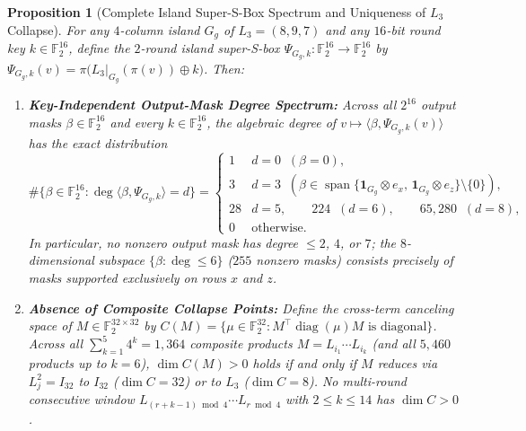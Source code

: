 \documentclass[11pt,a4paper]{article}
\newtheorem{proposition}{Proposition}
\theoremstyle{definition}
\theoremstyle{remark}
\newcommand{\Ftwo}{\mathbb{F}_2}
\newcommand{\spanF}{\operatorname{span}}
\begin{document}
\begin{proposition}[Complete Island Super-S-Box Spectrum and Uniqueness of $L_3$ Collapse]
\label{prop:supersbox-spectrum}
For any $4$-column island $G_g$ of $L_3 = (8,9,7)$ and any $16$-bit round key $k \in \Ftwo^{16}$, define the $2$-round island super-S-box $\Psi_{G_g, k}: \Ftwo^{16} \to \Ftwo^{16}$ by $\Psi_{G_g, k}(v) = \pi\bigl(L_3|_{G_g}(\pi(v)) \oplus k\bigr)$. Then:
\begin{enumerate}[leftmargin=1.8em]
    \item \textbf{Key-Independent Output-Mask Degree Spectrum:} Across all $2^{16}$ output masks $\beta \in \Ftwo^{16}$ and every $k \in \Ftwo^{16}$, the algebraic degree of $v \mapsto \langle \beta, \Psi_{G_g,k}(v)\rangle$ has the exact distribution
    \[
    \#\{\beta \in \Ftwo^{16} : \deg\langle \beta, \Psi_{G_g,k}\rangle = d\} =
    \begin{cases}
    1 & d = 0 \;\;(\beta = 0),\\
    3 & d = 3 \;\;(\beta \in \spanF\{\mathbf{1}_{G_g}\otimes e_x,\, \mathbf{1}_{G_g}\otimes e_z\}\setminus\{0\}),\\
    28 & d = 5, \qquad 224 \;\;(d = 6), \qquad 65{,}280 \;\;(d = 8),\\
    0 & \text{otherwise.}
    \end{cases}
    \]
    In particular, no nonzero output mask has degree $\le 2$, $4$, or $7$; the $8$-dimensional subspace $\{\beta : \deg \le 6\}$ ($255$ nonzero masks) consists precisely of masks supported exclusively on rows $x$ and $z$.
    \item \textbf{Absence of Composite Collapse Points:} Define the cross-term canceling space of $M \in \Ftwo^{32 \times 32}$ by $C(M) = \{\mu \in \Ftwo^{32} : M^\top \operatorname{diag}(\mu) M \text{ is diagonal}\}$. Across all $\sum_{k=1}^{5} 4^k = 1{,}364$ composite products $M = L_{i_1}\cdots L_{i_k}$ (and all $5{,}460$ products up to $k = 6$), $\dim C(M) > 0$ holds if and only if $M$ reduces via $L_j^2 = I_{32}$ to $I_{32}$ ($\dim C = 32$) or to $L_3$ ($\dim C = 8$). No multi-round consecutive window $L_{(r+k-1)\bmod 4}\cdots L_{r\bmod 4}$ with $2 \le k \le 14$ has $\dim C > 0$.
\end{enumerate}
\end{proposition}
\end{document}
